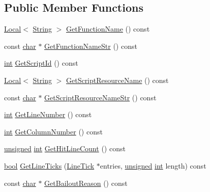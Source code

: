 \subsection*{Public Member Functions}
\begin{DoxyCompactItemize}
\item 
\mbox{\hyperlink{classv8_1_1Local}{Local}}$<$ \mbox{\hyperlink{classv8_1_1String}{String}} $>$ \mbox{\hyperlink{classv8_1_1CpuProfileNode_aa47d4405b0d48d5b02f6f675a1fb6ec1}{Get\+Function\+Name}} () const
\item 
const \mbox{\hyperlink{classchar}{char}} $\ast$ \mbox{\hyperlink{classv8_1_1CpuProfileNode_a72610abd44f019711321a99e6a38485f}{Get\+Function\+Name\+Str}} () const
\item 
\mbox{\hyperlink{classint}{int}} \mbox{\hyperlink{classv8_1_1CpuProfileNode_aef0b693911218f14745f2c51b4c9a860}{Get\+Script\+Id}} () const
\item 
\mbox{\hyperlink{classv8_1_1Local}{Local}}$<$ \mbox{\hyperlink{classv8_1_1String}{String}} $>$ \mbox{\hyperlink{classv8_1_1CpuProfileNode_aad0267a1f129380164bb9eff18ea60a7}{Get\+Script\+Resource\+Name}} () const
\item 
const \mbox{\hyperlink{classchar}{char}} $\ast$ \mbox{\hyperlink{classv8_1_1CpuProfileNode_a6efc31aba575973641d6ada68d9bf4ff}{Get\+Script\+Resource\+Name\+Str}} () const
\item 
\mbox{\hyperlink{classint}{int}} \mbox{\hyperlink{classv8_1_1CpuProfileNode_a6616c8d1893da19183d57e6488eb2743}{Get\+Line\+Number}} () const
\item 
\mbox{\hyperlink{classint}{int}} \mbox{\hyperlink{classv8_1_1CpuProfileNode_a9df61090cf365f1f03d5bce44653f1f5}{Get\+Column\+Number}} () const
\item 
\mbox{\hyperlink{classunsigned}{unsigned}} \mbox{\hyperlink{classint}{int}} \mbox{\hyperlink{classv8_1_1CpuProfileNode_a5b956d1b3aea5a9710632b28b1e85dfd}{Get\+Hit\+Line\+Count}} () const
\item 
\mbox{\hyperlink{classbool}{bool}} \mbox{\hyperlink{classv8_1_1CpuProfileNode_a3a05d924e53c241225b9d3bf61af05db}{Get\+Line\+Ticks}} (\mbox{\hyperlink{structv8_1_1CpuProfileNode_1_1LineTick}{Line\+Tick}} $\ast$entries, \mbox{\hyperlink{classunsigned}{unsigned}} \mbox{\hyperlink{classint}{int}} length) const
\item 
const \mbox{\hyperlink{classchar}{char}} $\ast$ \mbox{\hyperlink{classv8_1_1CpuProfileNode_ae96d7fad83e59fa09600f798bd559412}{Get\+Bailout\+Reason}} () const
\item 

\end{DoxyCompactItemize}
